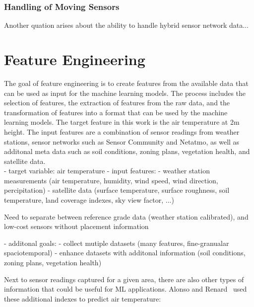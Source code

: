 \subsubsection{Handling of Moving Sensors}

Another quation arises about the ability to handle hybrid sensor network data...

\section{Feature Engineering}

The goal of feature engineering is to create features from the available data that can be used as input for the machine learning models. The process includes the selection of features, the extraction of features from the raw data, and the transformation of features into a format that can be used by the machine learning models.
The target feature in this work is the air temperature at 2m height. The input features are a combination of sensor readings from weather stations, sensor networks such as Sensor Community and Netatmo, as well as additonal meta data such as soil conditions, zoning plans, vegetation health, and satellite data.\\

- target variable: air temperature
- input features:
    - weather station measurements (air temperature, humidity, wind speed, wind direction, percipitation)
    - satellite data (surface temperature, surface roughness, soil temperature, land coverage indexes, sky view factor, ...)

    Need to separate between reference grade data (weather station calibrated), and low-cost sensors without placement information

- additonal goals:
    - collect mutiple datasets (many features, fine-granualar spaciotemporal)
    - enhance datasets with additonal information (soil conditions, zoning plans, vegetation health)


Next to sensor readings captured for a given area, there are also other types of information that could be useful for ML applications. Alonso and Renard~\cite{alonso2020new} used these additional indexes to predict air temperature:

